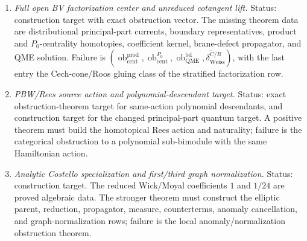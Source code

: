 \begin{enumerate}
  a chain map because
  \(d_{\mathrm{CE}}(\Theta_1(a)\wedge\Theta_1(b))\) has a single-cycle
  commutator term while deletion before \(d_{\mathrm{CE}}\) gives zero.
  The finite-rank bridge uses the normalized signed average
  \(\beta_{M,K,L}\) over injections into the \(L\) labeled diagonal
  blocks and the read-back map \(\alpha_{M,K,L}\), with
  \(\alpha_{M,K,L}\beta_{M,K,L}=\operatorname{id}\); its idempotent is
  \[
    P^{\mathrm{sep}}_{M,K,L}
    =
    \beta_{M,K,L}P_{1\mathrm{cyc}}\alpha_{M,K,L},
    \qquad
    M=L\max(K,L+2),
  \]
  while the same-rank chain-homotopy bridge is blocked by
  \[
    \Gamma_N=d_{\mathrm{same}}F_N-F_Nd_{\oplus}.
  \]
  The unqualified finite-window primitive statement is blocked by
  \[
    \mathcal O_{\mathrm{LQT},K,L}
    =
    (\mathcal O_{\mathrm{win}},
     \mathcal O_{\mathrm{Prim}},
     \mathcal O_{\mathrm{stab}},
     \mathcal O_{\mathrm{scalar}},
     \mathcal O_{\mathrm{CC}},
     \mathcal O_{\mathrm{Roos}}),
  \]
  where \(\mathcal O_{\mathrm{scalar}}\) is the failure of killing
  \(\Theta_1(\psi)\) alone to define a chain quotient:
  \(d_{\mathrm{CE}}\Theta_1(\psi)=\Theta_1(xy-yx)\).

  \item \emph{Full open BV factorization center and unreduced cotangent
  lift.}
  Status: construction target with exact obstruction vector.  The missing
  theorem data are distributional principal-part currents, boundary
  representatives, product and \(P_0\)-centrality homotopies,
  coefficient kernel, brane-defect propagator, and QME solution.
  Failure is
  \((\operatorname{ob}^{\mathrm{prod}}_{\mathrm{cent}},
  \operatorname{ob}^{P_0}_{\mathrm{cent}},
  \operatorname{ob}^{\mathrm{bd}}_{\mathrm{QME}},
  \delta_{\mathrm{Weiss}}^{\check C/R})\), with the last entry the
  Cech-cone/Roos gluing class of the stratified factorization row.

  \item \emph{PBW/Rees source action and polynomial-descendant target.}
  Status: exact obstruction-theorem target for same-action polynomial
  descendants, and construction target for the changed
  principal-part quantum target.  A positive theorem must build the
  homotopical Rees action and naturality; failure is the categorical
  obstruction to a polynomial sub-bimodule with the same Hamiltonian
  action.

  \item \emph{Analytic Costello specialization and first/third graph
  normalization.}
  Status: construction target.  The reduced Wick/Moyal coefficients
  \(1\) and \(1/24\) are proved algebraic data.  The stronger theorem
  must construct the elliptic parent, reduction, propagator, measure,
  counterterms, anomaly cancellation, and graph-normalization rows;
  failure is the local anomaly/normalization obstruction theorem.


\end{enumerate}
